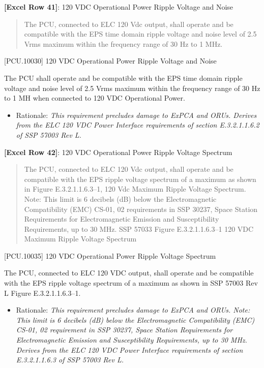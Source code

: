\textbf{[Excel Row 41]}: 120 VDC Operational Power Ripple Voltage and Noise

\begin{quote}
The PCU, connected to ELC 120 Vdc output, shall operate and be compatible with the EPS time domain ripple voltage and noise level of 2.5 Vrms maximum within the frequency range of 30 Hz to 1 MHz.
\end{quote}

[PCU.10030] 120 VDC Operational Power Ripple Voltage and Noise

The PCU shall operate and be compatible with the EPS time domain ripple voltage and noise level of 2.5 Vrms maximum within the frequency range of 30 Hz to 1 MH when connected to 120 VDC Operational Power.

\begin{itemize}
\item{} Rationale: \emph{This requirement precludes damage to ExPCA and ORUs. Derives from the ELC 120 VDC Power Interface requirements of section E.3.2.1.1.6.2 of SSP 57003 Rev L.}

\end{itemize}

\textbf{[Excel Row 42]}: 120 VDC Operational Power Ripple Voltage Spectrum

\begin{quote}
The PCU, connected to ELC 120 Vdc output, shall operate and be compatible with the EPS ripple voltage spectrum of a maximum as shown in Figure E.3.2.1.1.6.3--1, 120 Vdc Maximum Ripple Voltage Spectrum.
Note: This limit is 6 decibels (dB) below the Electromagnetic Compatibility (EMC) CS-01, 02 requirements in SSP 30237, Space Station Requirements for Electromagnetic Emission and Susceptibility Requirements, up to 30 MHz.
SSP 57033 Figure E.3.2.1.1.6.3--1 120 VDC Maximum Ripple Voltage Spectrum
\end{quote}

[PCU.10035] 120 VDC Operational Power Ripple Voltage Spectrum

The PCU, connected to ELC 120 VDC output, shall operate and be compatible with the EPS ripple voltage spectrum of a maximum as shown in SSP 57003 Rev L Figure E.3.2.1.1.6.3--1.

\begin{itemize}
\item{} Rationale: \emph{This requirement precludes damage to ExPCA and ORUs. Note: This limit is 6 decibels (dB) below the Electromagnetic Compatibility (EMC) CS-01, 02 requirement in SSP 30237, Space Station Requirements for Electromagnetic Emission and Susceptibility Requirements, up to 30 MHz. Derives from the ELC 120 VDC Power Interface requirements of section E.3.2.1.1.6.3 of SSP 57003 Rev L.}

\end{itemize}

